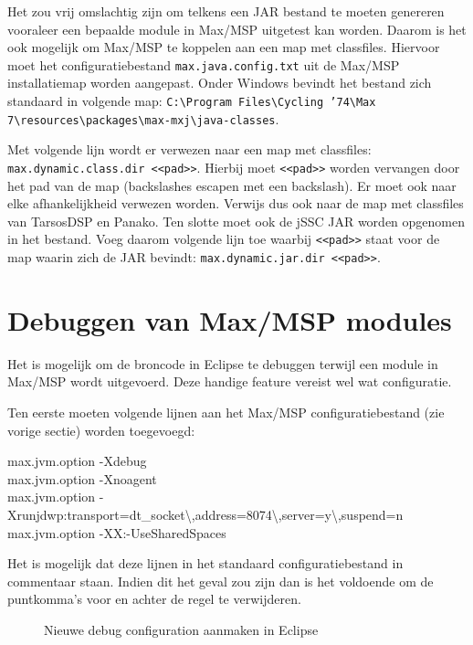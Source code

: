 Het zou vrij omslachtig zijn om telkens een JAR bestand te moeten genereren vooraleer een bepaalde module in Max/MSP uitgetest kan worden. Daarom is het ook mogelijk om Max/MSP te koppelen aan een map met classfiles. Hiervoor moet het configuratiebestand \texttt{max.java.config.txt} uit de Max/MSP installatiemap worden aangepast. Onder Windows bevindt het bestand zich standaard in volgende map: \texttt{C:\textbackslash Program Files\textbackslash Cycling '74\textbackslash Max 7\textbackslash resources\textbackslash packages\textbackslash max-mxj\textbackslash java-classes}.

Met volgende lijn wordt er verwezen naar een map met classfiles: \texttt{max.dynamic.class.dir <<pad>>}. Hierbij moet \texttt{<<pad>>} worden vervangen door het pad van de map (backslashes escapen met een backslash). Er moet ook naar elke afhankelijkheid verwezen worden. Verwijs dus ook naar de map met classfiles van TarsosDSP en Panako. Ten slotte moet ook de jSSC JAR worden opgenomen in het bestand. Voeg daarom volgende lijn toe waarbij \texttt{<<pad>>} staat voor de map waarin zich de JAR bevindt: \texttt{max.dynamic.jar.dir <<pad>>}.

\section*{Debuggen van Max/MSP modules}

Het is mogelijk om de broncode in Eclipse te debuggen terwijl een module in Max/MSP wordt uitgevoerd. Deze handige feature vereist wel wat configuratie.

Ten eerste moeten volgende lijnen aan het Max/MSP configuratiebestand (zie vorige sectie) worden toegevoegd:

\begin{allintypewriter}
max.jvm.option -Xdebug \\
max.jvm.option -Xnoagent \\
max.jvm.option -Xrunjdwp:transport=dt\_socket\textbackslash ,address=8074\textbackslash,server=y\textbackslash,suspend=n \\
max.jvm.option -XX:-UseSharedSpaces
\end{allintypewriter}
Het is mogelijk dat deze lijnen in het standaard configuratiebestand in commentaar staan. Indien dit het geval zou zijn dan is het voldoende om de puntkomma's voor en achter de regel te verwijderen.

\begin{figure}[!tbph]
	\centering
	\hfill
	\hfill
	\captionsetup{width=0.7\textwidth}
	\caption{Nieuwe debug configuration aanmaken in Eclipse}
	\label{debugconf}
\end{figure}


